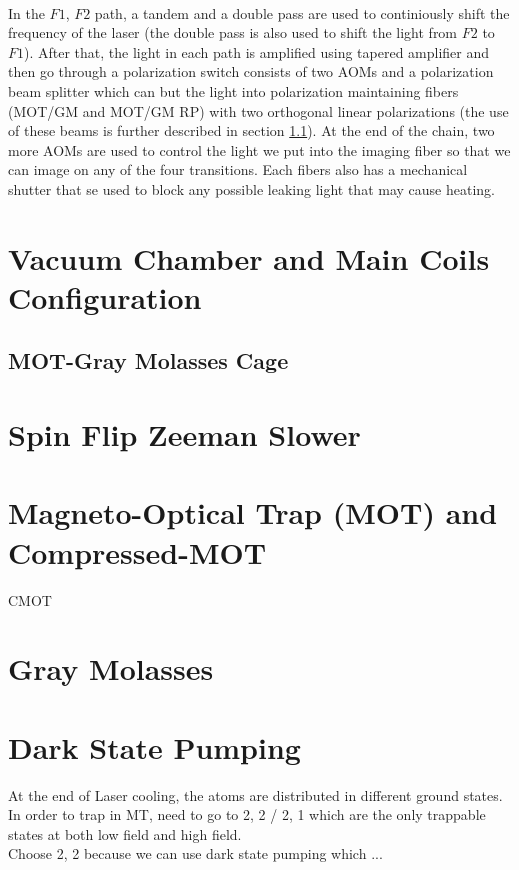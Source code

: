 \\
In the $F1$, $F2$ path, a tandem and a double pass are used to continiously shift the frequency of the laser (the double pass is also used to shift the light from $F2$ to $F1$). After that, the light in each path is amplified using tapered amplifier and then go through a polarization switch consists of two AOMs and a polarization beam splitter which can but the light into polarization maintaining fibers (MOT/GM and MOT/GM RP) with two orthogonal linear polarizations (the use of these beams is further described in section \ref{exp:mot-cage}). At the end of the chain, two more AOMs are used to control the light we put into the imaging fiber so that we can image on any of the four transitions. Each fibers also has a mechanical shutter that se used to block any possible leaking light that may cause heating.

\section{Vacuum Chamber and Main Coils Configuration}\label{exp:machine-table}

\subsection{MOT-Gray Molasses Cage}\label{exp:mot-cage}

\section{Spin Flip Zeeman Slower}\label{exp:zeeman}

\section{Magneto-Optical Trap (MOT) and Compressed-MOT}\label{exp:mot}

CMOT

\section{Gray Molasses}\label{exp:gm}

\section{Dark State Pumping}\label{exp:pump}

At the end of Laser cooling, the atoms are distributed in different ground states.\\
In order to trap in MT, need to go to 2, 2 / 2, 1 which are the only trappable states at both low field and high field.\\
Choose 2, 2 because we can use dark state pumping which ...

